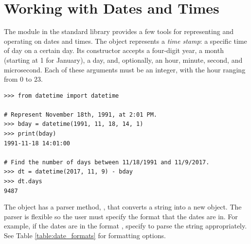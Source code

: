 

\section*{Working with Dates and Times} %

The  module in the standard library provides a few tools for representing and operating on dates and times.
The  object represents a \emph{time stamp}: a specific time of day on a certain day.
Its constructor accepts a four-digit year, a month (starting at 1 for January), a day, and, optionally, an hour, minute, second, and microsecond.
Each of these arguments must be an integer, with the hour ranging from $0$ to $23$.

\begin{lstlisting}
>>> from datetime import datetime

# Represent November 18th, 1991, at 2:01 PM.
>>> bday = datetime(1991, 11, 18, 14, 1)
>>> print(bday)
1991-11-18 14:01:00

# Find the number of days between 11/18/1991 and 11/9/2017.
>>> dt = datetime(2017, 11, 9) - bday
>>> dt.days
9487
\end{lstlisting}

The  object has a parser method, , that converts a string into a new  object.
The parser is flexible so the user must specify the format that the dates are in.
For example, if the dates are in the format , specify  to parse the string appropriately.
See Table \ref{table:date_formats} for formatting options.

